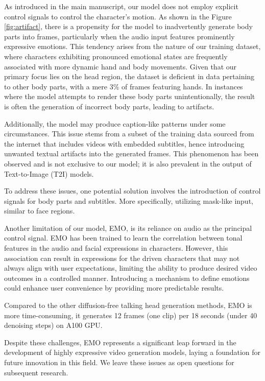 \documentclass[runningheads]{llncs}
\begin{document}
As introduced in the main manuscript, our model does not employ explicit control signals to control the character's motion. As shown in the Figure \ref{fig:artifact}, there is a propensity for the model to inadvertently generate body parts into frames, particularly when the audio input features prominently expressive emotions. This tendency arises from the nature of our training dataset, where characters exhibiting pronounced emotional states are frequently associated with more dynamic hand and body movements. Given that our primary focus lies on the head region, the dataset is deficient in data pertaining to other body parts, with a mere 3\% of frames featuring hands. In instances where the model attempts to render these body parts unintentionally, the result is often the generation of incorrect body parts, leading to artifacts.

Additionally, the model may produce caption-like patterns under some circumstances. This issue stems from a subset of the training data sourced from the internet that includes videos with embedded subtitles, hence introducing unwanted textual artifacts into the generated frames. This phenomenon has been observed and is not exclusive to our model; it is also prevalent in the output of Text-to-Image (T2I) models.

To address these issues, one potential solution involves the introduction of control signals for body parts and subtitles. More specifically, utilizing mask-like input, similar to face regions.

Another limitation of our model, EMO, is its reliance on audio as the principal control signal. EMO has been trained to learn the correlation between tonal features in the audio and facial expressions in characters. However, this association can result in expressions for the driven characters that may not always align with user expectations, limiting the ability to produce desired video outcomes in a controlled manner. Introducing a mechanism to define emotions could enhance user convenience by providing more predictable results.

Compared to the other diffusion-free talking head generation methods, EMO is more time-consuming, it generates 12 frames (one clip) per 18 seconds (under 40 denoising steps) on A100 GPU.

Despite these challenges, EMO represents a significant leap forward in the development of highly expressive video generation models, laying a foundation for future innovation in this field. We leave these issues as open questions for subsequent research.






\end{document}

